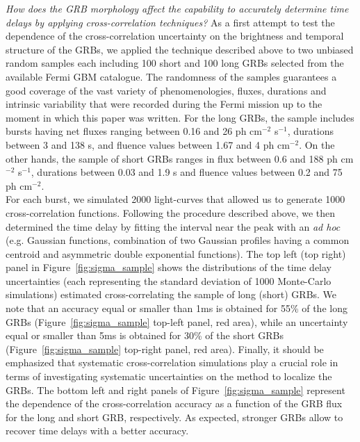 \documentclass[]{spie}  %
\begin{document}
\emph{How does the GRB morphology affect the capability to accurately determine time delays by applying cross-correlation techniques?}
As a first attempt to test the dependence of the cross-correlation uncertainty on the brightness and temporal structure of the GRBs, we applied the technique described above to two unbiased random samples each including 100 short and 100 long GRBs selected from the available Fermi GBM catalogue.
The randomness of the samples guarantees a good coverage of the vast variety of phenomenologies, fluxes, durations and intrinsic variability that were recorded during the Fermi mission up to the moment in which this paper was written. For the long GRBs, the sample includes bursts having net fluxes ranging between 0.16 and 26 ph cm$^{-2}$ s$^{-1}$, durations between 3 and 138 s, and fluence values between 1.67 and 4 ph cm$^{-2}$. On the other hands, the sample of short GRBs ranges in flux between 0.6 and 188 ph cm$^{-2}$ s$^{-1}$, durations between 0.03 and 1.9 s and fluence values between 0.2 and 75 ph cm$^{-2}$.\\

For each burst, we simulated 2000 light-curves that allowed us to generate 1000 cross-correlation functions. Following the procedure described above, we then determined the time delay by fitting the interval near the peak with an \emph{ad hoc} (e.g. Gaussian functions, combination of two Gaussian profiles having a common centroid and asymmetric double exponential functions). The top left (top right) panel in Figure~\ref{fig:sigma_sample} shows the distributions of the time delay uncertainties (each representing the standard deviation of 1000 Monte-Carlo simulations) estimated cross-correlating the sample of long (short) GRBs. We note that an accuracy equal or smaller than 1ms is obtained for 55\% of the long GRBs (Figure~\ref{fig:sigma_sample} top-left panel, red area), while an uncertainty equal or smaller than 5ms is obtained for 30\% of the short GRBs (Figure~\ref{fig:sigma_sample} top-right panel, red area). Finally, it should be emphasized that systematic cross-correlation simulations play a crucial role in terms of investigating systematic uncertainties on the method to localize the GRBs. The bottom left and right panels of Figure~\ref{fig:sigma_sample} represent the dependence of the cross-correlation accuracy as a function of the GRB flux for the long and short GRB, respectively. As expected, stronger GRBs allow to recover time delays with a better accuracy.    
\end{document}
